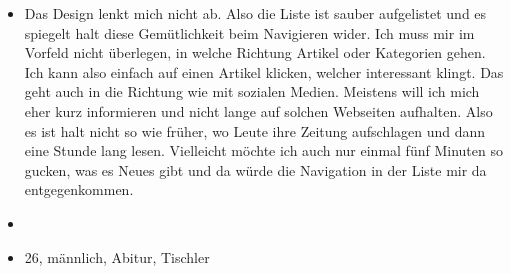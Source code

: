 {\begin{itemize}[]
            \item {} Das Design lenkt mich nicht ab.
                  Also die Liste ist sauber aufgelistet und es spiegelt halt diese Gemütlichkeit beim Navigieren wider.
                  Ich muss mir im Vorfeld nicht überlegen, in welche Richtung Artikel oder Kategorien gehen.
                  Ich kann also einfach auf einen Artikel klicken, welcher interessant klingt.
                  Das geht auch in die Richtung wie mit sozialen Medien.
                  Meistens will ich mich eher kurz informieren und nicht lange auf solchen Webseiten aufhalten.
                  Also es ist halt nicht so wie früher, wo Leute ihre Zeitung aufschlagen und dann eine Stunde lang lesen.
                  Vielleicht möchte ich auch nur einmal fünf Minuten so gucken, was es Neues gibt und da würde die Navigation in der Liste mir da entgegenkommen.
            \item {}
            \item {} 26, männlich, Abitur, Tischler
      \end{itemize}}
\nolinenumbers
